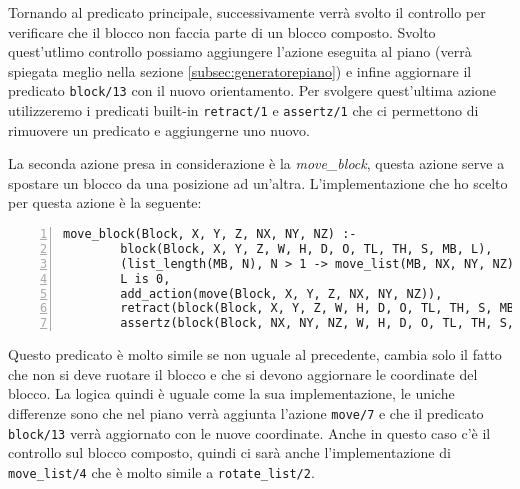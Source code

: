 Tornando al predicato principale, successivamente verrà svolto il controllo per verificare che il blocco non faccia parte di un blocco composto. Svolto quest'utlimo controllo possiamo aggiungere l'azione eseguita al piano (verrà spiegata meglio nella sezione \ref{subsec:generatorepiano}) e infine aggiornare il predicato \verb+block/13+ con il nuovo orientamento.
Per svolgere quest'ultima azione utilizzeremo i predicati built-in \verb+retract/1+ e \verb+assertz/1+ che ci permettono di rimuovere un predicato e aggiungerne uno nuovo.

La seconda azione presa in considerazione è la \textit{move\_block}, questa azione serve a spostare un blocco da una posizione ad un'altra. L'implementazione che ho scelto per questa azione è la seguente:
\begin{Verbatim}[numbers=left]
    move_block(Block, X, Y, Z, NX, NY, NZ) :-
        block(Block, X, Y, Z, W, H, D, O, TL, TH, S, MB, L),
        (list_length(MB, N), N > 1 -> move_list(MB, NX, NY, NZ); NX = NX, NY = NY, NZ = NZ),
        L is 0,
        add_action(move(Block, X, Y, Z, NX, NY, NZ)),
        retract(block(Block, X, Y, Z, W, H, D, O, TL, TH, S, MB, L)),
        assertz(block(Block, NX, NY, NZ, W, H, D, O, TL, TH, S, MB, L)).
\end{Verbatim}
Questo predicato è molto simile se non uguale al precedente, cambia solo il fatto che non si deve ruotare il blocco e che si devono aggiornare le coordinate del blocco. La logica quindi è uguale come la sua implementazione, le uniche differenze sono che nel piano verrà aggiunta l'azione \verb+move/7+ e che il predicato \verb+block/13+ verrà aggiornato con le nuove coordinate. Anche in questo caso c'è il controllo sul blocco composto, quindi ci sarà anche l'implementazione di \verb+move_list/4+ che è molto simile a \verb+rotate_list/2+.

